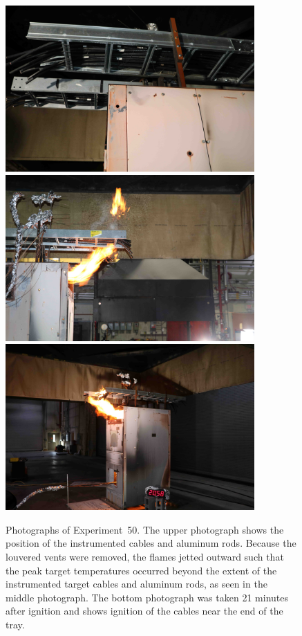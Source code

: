 \begin{figure}[p]
\centering
\includegraphics[height=2.50in]{../FIGURES/Test_50_cables} \\ \vspace{0.1in}
\includegraphics[height=2.50in]{../FIGURES/Test_50_side} \\ \vspace{0.1in}
\includegraphics[height=2.50in]{../FIGURES/Test_50_20_min_58_s}
\caption[Photographs of Experiment~50]{Photographs of Experiment~50. The upper photograph shows the position of the instrumented cables and aluminum rods. Because the louvered vents were removed, the flames jetted outward such that the peak target temperatures occurred beyond the extent of the instrumented target cables and aluminum rods, as seen in the middle photograph. The bottom photograph was taken 21 minutes after ignition and shows ignition of the cables near the end of the tray.}
\label{fig:Test_50_photos}
\end{figure}



